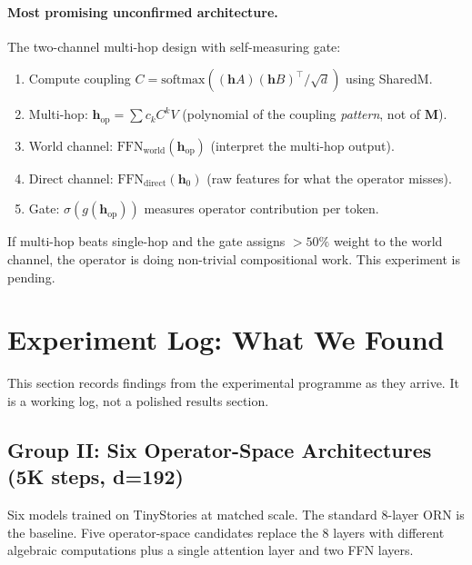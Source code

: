 \documentclass[11pt, a4paper]{article}
\newcommand{\M}{\mathbf{M}}
\newcommand{\h}{\mathbf{h}}
\theoremstyle{plain}
\theoremstyle{definition}
\theoremstyle{remark}
\begin{document}
\paragraph{Most promising unconfirmed architecture.}
The two-channel multi-hop design with self-measuring gate:
\begin{enumerate}[nosep]
\item Compute coupling $C = \mathrm{softmax}((\h A)(\h B)^\top / \sqrt{d})$ using SharedM.
\item Multi-hop: $\h_{\mathrm{op}} = \sum c_k C^k V$ (polynomial of the coupling \emph{pattern}, not of $\M$).
\item World channel: $\mathrm{FFN}_{\mathrm{world}}(\h_{\mathrm{op}})$ (interpret the multi-hop output).
\item Direct channel: $\mathrm{FFN}_{\mathrm{direct}}(\h_0)$ (raw features for what the operator misses).
\item Gate: $\sigma(g(\h_{\mathrm{op}}))$ measures operator contribution per token.
\end{enumerate}
If multi-hop beats single-hop and the gate assigns $>50\%$ weight to the world channel, the operator is doing non-trivial compositional work.
This experiment is pending.


\section{Experiment Log: What We Found}
\label{sec:experiment-log}

This section records findings from the experimental programme as they arrive.
It is a working log, not a polished results section.

\subsection{Group II: Six Operator-Space Architectures (5K steps, d=192)}

Six models trained on TinyStories at matched scale.
The standard 8-layer ORN is the baseline.
Five operator-space candidates replace the 8 layers with different algebraic computations plus a single attention layer and two FFN layers.
\end{document}
